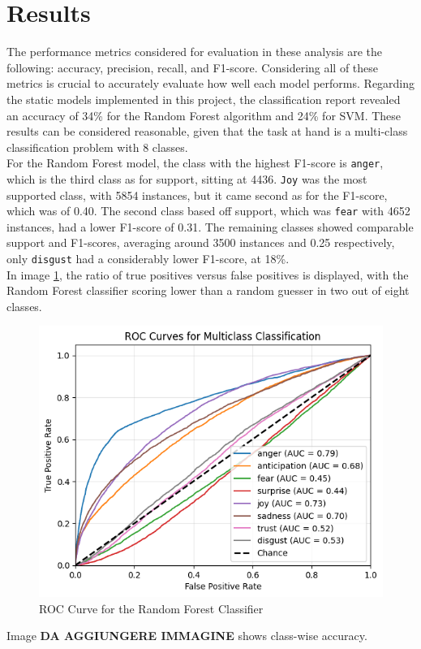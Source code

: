 \chapter*{Results}
\label{ch:results}
The performance metrics considered for evaluation in these analysis are the
following: accuracy, precision, recall, and F1-score. Considering all of these
metrics is crucial to accurately evaluate how well each model performs.
Regarding the static models implemented in this project, the classification
report revealed an accuracy of 34\% for the Random Forest algorithm and 24\% for
SVM. These results can be considered reasonable, given that the task at hand
is a multi-class classification problem with 8 classes.\\

For the Random Forest model, the class with the highest F1-score is \texttt{anger},
which is the third class as for support, sitting at 4436. 
\texttt{Joy} was the most supported class, with 5854 instances, but it came second
as for the F1-score, which was of 0.40. The second class based off support, which
was \texttt{fear} with 4652 instances, had a lower F1-score of 0.31. 
The remaining classes showed comparable support and F1-scores, averaging around
3500 instances and 0.25 respectively, only \texttt{disgust} had a considerably
lower F1-score, at 18\%. \\
In image \ref{fig:roc_rf}, the ratio of true positives versus false positives is
displayed, with the Random Forest classifier scoring lower than a random guesser in
two out of eight classes. \\
\begin{figure}[H]
    \centering
    \includegraphics[width=0.7\linewidth]{pictures/roc_rf.png}
    \caption{ROC Curve for the Random Forest Classifier}
    \label{fig:roc_rf}
\end{figure}
Image \textbf{DA AGGIUNGERE IMMAGINE} shows class-wise accuracy. \\

